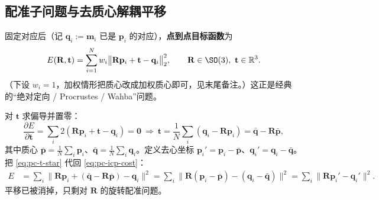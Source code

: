 \subsection{配准子问题与去质心解耦平移}
\label{sec:pc-icp-decouple}

固定对应后（记 $\mathbf{q}_i:=\mathbf{m}_i$ 已是 $\mathbf{p}_i$ 的对应），\textbf{点到点目标函数}为
\begin{equation}
  E(\mathbf{R},\mathbf{t})=\sum_{i=1}^{N}w_i\big\|\mathbf{R}\mathbf{p}_i+\mathbf{t}-\mathbf{q}_i\big\|_2^2,
  \qquad \mathbf{R}\in\SO(3),\ \mathbf{t}\in\mathbb{R}^3.
  \label{eq:pc-icp-cost}
\end{equation}
（下设 $w_i=1$，加权情形把质心改成加权质心即可，见末尾备注。）这正是经典的“绝对定向 / Procrustes / Wahba”问题\cite{arun1987leastsquares,horn1987absolute}。

\begin{derivation}
对 $\mathbf{t}$ 求偏导并置零：
\begin{equation}
  \frac{\partial E}{\partial\mathbf{t}}=\sum_i 2(\mathbf{R}\mathbf{p}_i+\mathbf{t}-\mathbf{q}_i)=\mathbf{0}
  \ \Longrightarrow\
  \mathbf{t}=\frac{1}{N}\sum_i(\mathbf{q}_i-\mathbf{R}\mathbf{p}_i)=\bar{\mathbf{q}}-\mathbf{R}\bar{\mathbf{p}},
  \label{eq:pc-t-star}
\end{equation}
其中质心 $\bar{\mathbf{p}}=\frac{1}{N}\sum_i\mathbf{p}_i$、$\bar{\mathbf{q}}=\frac{1}{N}\sum_i\mathbf{q}_i$。定义去心坐标 $\mathbf{p}_i'=\mathbf{p}_i-\bar{\mathbf{p}}$、$\mathbf{q}_i'=\mathbf{q}_i-\bar{\mathbf{q}}$。把 \cref{eq:pc-t-star} 代回 \cref{eq:pc-icp-cost}：
\begin{align}
  E&=\sum_i\big\|\mathbf{R}\mathbf{p}_i+(\bar{\mathbf{q}}-\mathbf{R}\bar{\mathbf{p}})-\mathbf{q}_i\big\|^2
   =\sum_i\big\|\mathbf{R}(\mathbf{p}_i-\bar{\mathbf{p}})-(\mathbf{q}_i-\bar{\mathbf{q}})\big\|^2
   =\sum_i\big\|\mathbf{R}\mathbf{p}_i'-\mathbf{q}_i'\big\|^2.
  \label{eq:pc-E-decentered}
\end{align}
平移已被消掉，只剩对 $\mathbf{R}$ 的旋转配准问题。
\end{derivation}

